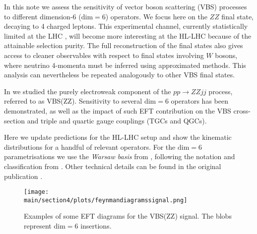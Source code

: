 
In this note we assess the sensitivity of vector boson scattering (VBS) processes to different dimension-6 ($\mathrm{dim=6}$) operators. We focus here on the $ZZ$ final state, decaying to 4 charged leptons. This experimental channel, currently statistically limited at the LHC \cite{Sirunyan:2017fvv}, will become more interesting at the HL-LHC because of the attainable selection purity. The full reconstruction of the final states also gives access to cleaner observables with respect to final states involving $W$ bosons, where neutrino 4-momenta must be inferred using approximated methods.
This analysis can nevertheless be repeated analogously to other VBS final states. 

In \cite{Gomez-Ambrosio:2018pnl} we studied the purely electroweak component of the $p p \to Z Z j j$ process, referred to as VBS(ZZ). Sensitivity to several $\mathrm{dim=6}$ operators has been demonstrated, as well as the impact of such EFT contribution on the VBS cross-section and triple and quartic gauge couplings (TGCs and QGCs). 

Here we update predictions for the HL-LHC setup and show the kinematic distributions for a handful of relevant operators. For the $\mathrm{dim=6}$ parametrisations we use the \emph{Warsaw basis} from \cite{Grzadkowski:2010es}, following the notation and classification from \cite{Jenkins:2013zja}. Other technical details can be found in the original publication \cite{Gomez-Ambrosio:2018pnl}.

\begin{figure}[h!]
\texttt{[image: \\main/section4/plots/feynmandiagramssignal.png]}
\caption{Examples of some EFT diagrams for the VBS(ZZ) signal. The blobs represent $\mathrm{dim=6}$ insertions.}
\end{figure}

